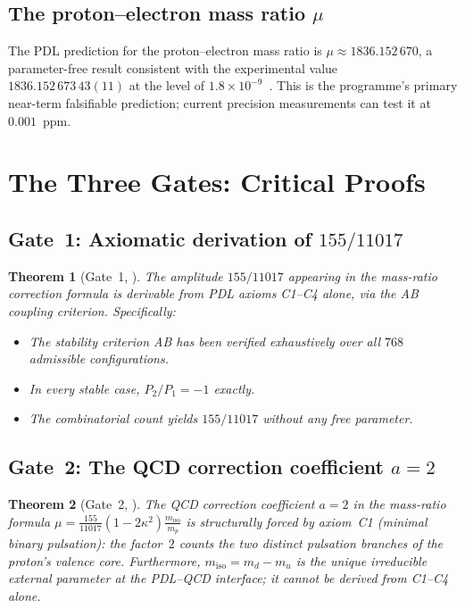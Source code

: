 \documentclass[11pt,a4paper]{article}
\theoremstyle{plain}
\newtheorem{theorem}{Theorem}[section]
\theoremstyle{definition}
\theoremstyle{remark}
\begin{document}
\subsection{The proton--electron mass ratio \texorpdfstring{$\mu$}{mu}}
\label{subsec:mu}
The PDL prediction for the proton--electron mass ratio is $\mu\approx 1836.152\,670$, a parameter-free result consistent with the experimental value $1836.152\,673\,43(11)$ at the level of $1.8\times10^{-9}$~\cite{D28,D29,D30}. This is the programme's primary near-term falsifiable prediction; current precision measurements can test it at $0.001$~ppm.

\section{The Three Gates: Critical Proofs}
\label{sec:gates}

\subsection{Gate~1: Axiomatic derivation of \texorpdfstring{$155/11017$}{155/11017}}
\label{subsec:gate1}
\begin{theorem}[Gate~1, \cite{D29}]
\label{thm:Gate1}
The amplitude $155/11017$ appearing in the mass-ratio correction formula is derivable from PDL axioms C1--C4 alone, via the AB coupling criterion. Specifically:
\begin{itemize}
\item The stability criterion AB has been verified exhaustively over all $768$ admissible configurations.
\item In every stable case, $P_2/P_1=-1$ exactly.
\item The combinatorial count yields $155/11017$ without any free parameter.
\end{itemize}
\end{theorem}

\subsection{Gate~2: The QCD correction coefficient \texorpdfstring{$a=2$}{a=2}}
\label{subsec:gate2}
\begin{theorem}[Gate~2, \cite{D30}]
\label{thm:Gate2}
The QCD correction coefficient $a=2$ in the mass-ratio formula $\mu=\frac{155}{11017}(1-2\kappa^2)\frac{m_{\mathrm{iso}}}{m_p}$ is structurally forced by axiom~C1 (minimal binary pulsation): the factor~$2$ counts the two distinct pulsation branches of the proton's valence core. Furthermore, $m_{\mathrm{iso}}=m_d-m_u$ is the unique irreducible external parameter at the PDL--QCD interface; it cannot be derived from C1--C4 alone.
\end{theorem}
\end{document}
